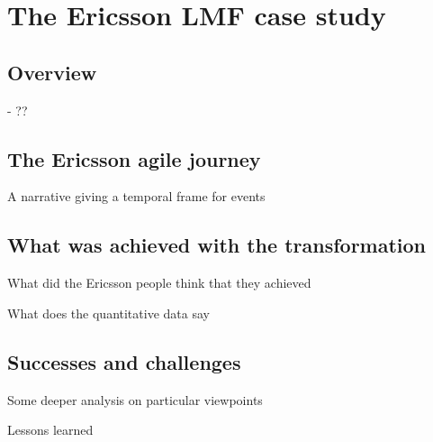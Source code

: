 
\chapter{The Ericsson LMF case study}
\label{chapter:ericsson}


\section{Overview}

- ??


\section{The Ericsson agile journey}

A narrative giving a temporal frame for events


\section{What was achieved with the transformation}

What did the Ericsson people think that they achieved

What does the quantitative data say


\section{Successes and challenges}

Some deeper analysis on particular viewpoints

Lessons learned
